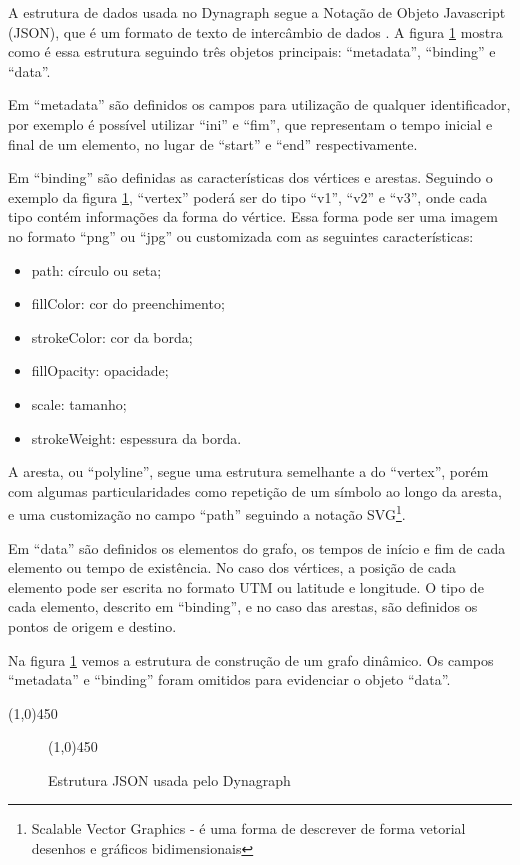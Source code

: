 A estrutura de dados usada no Dynagraph segue a Notação de Objeto Javascript (JSON), que é um formato de texto de intercâmbio de dados \cite{douglas}.
A figura \ref{fig:jsondyn} mostra como é essa estrutura seguindo três objetos principais: ``metadata'', ``binding'' e ``data''.

Em ``metadata'' são definidos os campos para utilização de qualquer identificador, por exemplo é possível utilizar ``ini'' e ``fim'',
que representam o tempo inicial e final de um elemento, no lugar de ``start'' e ``end'' respectivamente.

Em ``binding'' são definidas as características dos vértices e arestas. Seguindo o exemplo da figura \ref{fig:jsondyn}, ``vertex'' poderá
ser do tipo ``v1'', ``v2'' e ``v3'', onde cada tipo contém informações da forma do vértice. Essa forma pode ser uma imagem no formato
``png'' ou ``jpg'' ou customizada com as seguintes características:
\begin{itemize}
\item path: círculo ou seta;
\item fillColor: cor do preenchimento;
\item strokeColor: cor da borda;
\item fillOpacity: opacidade;
\item scale: tamanho;
\item strokeWeight: espessura da borda.
\end{itemize}
A aresta, ou ``polyline'', segue uma estrutura semelhante a do ``vertex'', porém com algumas particularidades como repetição de um símbolo
ao longo da aresta, e uma customização no campo ``path'' seguindo a notação
SVG\footnote{\label{note} Scalable Vector Graphics - é uma forma de descrever de forma vetorial desenhos e gráficos bidimensionais}.

Em ``data'' são definidos os elementos do grafo, os tempos de início e fim de cada elemento ou tempo de existência.
No caso dos vértices, a posição de cada elemento pode ser escrita no formato UTM ou latitude e longitude.
O tipo de cada elemento, descrito em ``binding'', e no caso das arestas, são definidos os pontos de origem e destino.

Na figura \ref{fig:jsondyn} vemos a estrutura de construção de um grafo dinâmico.
Os campos ``metadata'' e ``binding'' foram omitidos para evidenciar o objeto ``data''.
\FloatBarrier
\begin{center}
  \line(1,0){450}
\end{center}

\begin{figure}[htbp]
  \begin{center}
    \line(1,0){450}
  \end{center}
  \centering
  \caption{Estrutura JSON usada pelo Dynagraph}
  \label{fig:jsondyn}
\end{figure}

